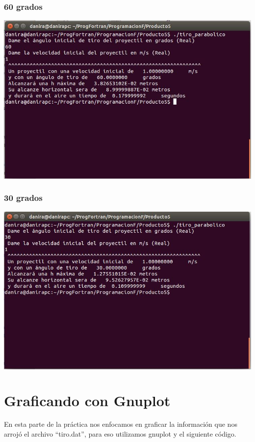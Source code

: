 \documentclass[10pt]{article}
\begin{document}
\subsubsection{60 grados}
\begin{center}
   \includegraphics[scale=0.5]{tiro60.JPG}
\end{center}

\subsubsection{30 grados}
\begin{center}
   \includegraphics[scale=0.5]{tiro30.JPG}
\end{center}





\newpage


\section{Graficando con Gnuplot}
En esta parte de la práctica nos enfocamos en graficar la información que nos arrojó el archivo ``tiro.dat'', para eso utilizamos gnuplot y el siguiente código.
\end{document}
